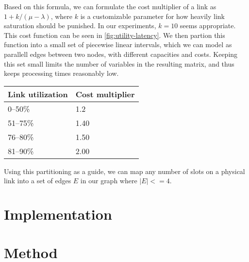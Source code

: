 
Based on this formula, we can formulate the cost multiplier of a link as $1 + k/(\mu - \lambda)$, where $k$ is a customizable parameter for how heavily link saturation should be punished. In our experiments, $k=10$ seems appropriate. This cost function can be seen in \autoref{fig:utility-latency}. We then partion this function into a small set of piecewise linear intervals, which we can model as parallell edges between two nodes, with different capacities and costs. Keeping this set small limits the number of variables in the resulting matrix, and thus keeps processing times reasonably low.



\begin{center}
    \label{tab:utilization-to-cost}
    \begin{tabular}{| l | l |}
    \hline
    \textbf{Link utilization} & \textbf{Cost multiplier} \\ \hline
    0--50\% & 1.2 \\ \hline
    51--75\% & 1.40 \\ \hline
    76--80\% & 1.50 \\ \hline
    81--90\% & 2.00 \\ \hline
    \end{tabular}
\end{center}

Using this partitioning as a guide, we can map any number of slots on a physical link into a set of edges $E$ in our graph where $|E| <= 4$.




\section{Implementation}\label{sec:implementation}



\section{Method}\label{sec:method}

